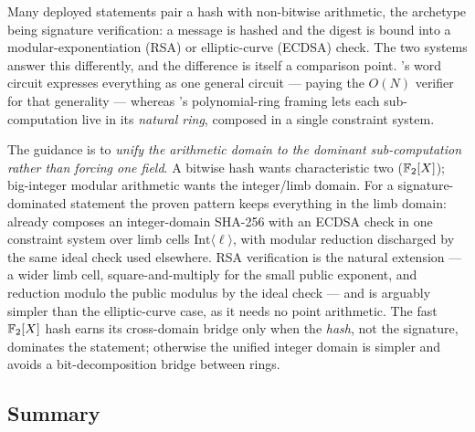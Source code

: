 Many deployed statements pair a hash with non-bitwise arithmetic, the
archetype being signature verification: a message is hashed and the
digest is bound into a modular-exponentiation (RSA) or elliptic-curve
(ECDSA) check. The two systems answer this differently, and the
difference is itself a comparison point. \binius{}'s word circuit
expresses everything as one general circuit --- paying the $O(N)$
verifier for that generality --- whereas \zinc{}'s polynomial-ring
framing lets each sub-computation live in its \emph{natural ring},
composed in a single constraint system.

The guidance is to \emph{unify the arithmetic domain to the dominant
sub-computation rather than forcing one field}. A bitwise hash wants
characteristic two ($\mathbb{F}_2[X]$); big-integer modular arithmetic wants the
integer/limb domain. For a signature-dominated statement the proven
pattern keeps everything in the limb domain: \zinc{} already composes an
integer-domain SHA-256 with an ECDSA check in one constraint system over
limb cells $\mathrm{Int}\langle\ell\rangle$, with modular reduction
discharged by the same ideal check used elsewhere. RSA verification is
the natural extension --- a wider limb cell, square-and-multiply for the
small public exponent, and reduction modulo the public modulus by the
ideal check --- and is arguably simpler than the elliptic-curve case, as
it needs no point arithmetic. The fast $\mathbb{F}_2[X]$ hash earns its
cross-domain bridge only when the \emph{hash}, not the signature,
dominates the statement; otherwise the unified integer domain is simpler
and avoids a bit-decomposition bridge between rings.

\subsection{Summary}
\label{sec:guid-summary}

